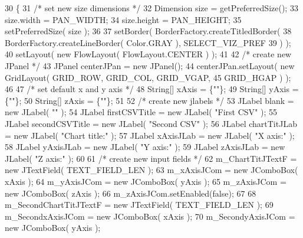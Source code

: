 \begin{DoxyCode}
30                            \{
31         \textcolor{comment}{/* set new size dimensions */}
32         Dimension size = getPreferredSize();
33         size.width = PAN\_WIDTH;
34         size.height = PAN\_HEIGHT;
35         setPreferredSize( size );
36         
37         setBorder( BorderFactory.createTitledBorder(
38                 BorderFactory.createLineBorder( Color.GRAY ), SELECT\_VIZ\_PREF
39                  ) );
40         setLayout( \textcolor{keyword}{new} FlowLayout( FlowLayout.CENTER ) );
41         
42         \textcolor{comment}{/* create new JPanel */}
43         JPanel centerJPan = \textcolor{keyword}{new} JPanel();
44         centerJPan.setLayout( \textcolor{keyword}{new} GridLayout( GRID\_ROW, GRID\_COL, GRID\_VGAP, 
45                 GRID\_HGAP ) );
46         
47         \textcolor{comment}{/* set default x and y axis */}
48         String[] xAxis = \{\textcolor{stringliteral}{""}\};
49         String[] yAxis = \{\textcolor{stringliteral}{""}\};
50         String[] zAxis = \{\textcolor{stringliteral}{""}\};
51         
52         \textcolor{comment}{/* create new jlabels */}
53         JLabel blank = \textcolor{keyword}{new} JLabel( \textcolor{stringliteral}{""} );
54         JLabel firstCSVTitle = \textcolor{keyword}{new} JLabel( \textcolor{stringliteral}{"First CSV"} );
55         JLabel secondCSVTitle = \textcolor{keyword}{new} JLabel( \textcolor{stringliteral}{"Second CSV"} );
56         JLabel chartTitJLab = \textcolor{keyword}{new} JLabel( \textcolor{stringliteral}{"Chart title:"} );
57         JLabel xAxisJLab = \textcolor{keyword}{new} JLabel( \textcolor{stringliteral}{"X axis:"} );
58         JLabel yAxisJLab = \textcolor{keyword}{new} JLabel( \textcolor{stringliteral}{"Y axis:"} );
59         JLabel zAxisJLab = \textcolor{keyword}{new} JLabel( \textcolor{stringliteral}{"Z axis:"} );
60         
61         \textcolor{comment}{/* create new input fields */}
62         m\_ChartTitJTextF = \textcolor{keyword}{new} JTextField( TEXT\_FIELD\_LEN );
63         m\_xAxisJCom = \textcolor{keyword}{new} JComboBox( xAxis );
64         m\_yAxisJCom = \textcolor{keyword}{new} JComboBox( yAxis );
65         m\_zAxisJCom = \textcolor{keyword}{new} JComboBox( zAxis );
66         m\_zAxisJCom.setEnabled(\textcolor{keyword}{false});
67         
68         m\_SecondChartTitJTextF = \textcolor{keyword}{new} JTextField( TEXT\_FIELD\_LEN );
69         m\_SecondxAxisJCom = \textcolor{keyword}{new} JComboBox( xAxis );
70         m\_SecondyAxisJCom = \textcolor{keyword}{new} JComboBox( yAxis );

\end{DoxyCode}
